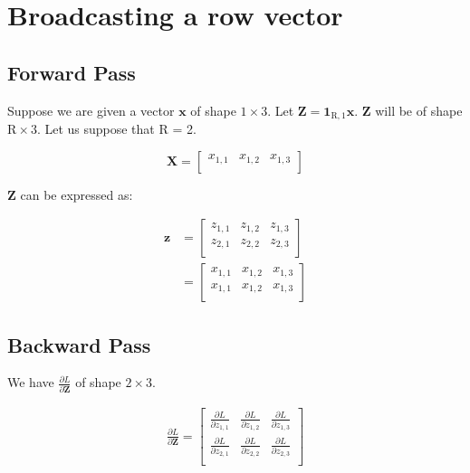 \documentclass{article}
\newcommand{\vecr}[1]{\bm{#1}}
\newcommand{\matr}[1]{\mathbf{#1}} %
\begin{document}
\section{Broadcasting a row vector}
\subsection{Forward Pass}
Suppose we are given a vector $\vecr{x}$ of shape $1 \times 3$. Let $\matr{Z} = \mathbf{1}_{\text{R},1} \vecr{x}$. $\matr{Z}$ will be of shape $\text{R} \times 3$. Let us suppose that R = 2.

\begin{displaymath}
\matr{X} =
\begin{bmatrix}
x_{1,1} & x_{1,2} & x_{1,3} \\%
\end{bmatrix}
\end{displaymath}

$\matr{Z}$ can be expressed as:

\begin{align}
\vecr{z} &=
\begin{bmatrix}
z_{1,1} & z_{1,2} & z_{1,3} \\
z_{2,1} & z_{2,2} & z_{2,3} \\
\end{bmatrix}
\nonumber \\
&=
\begin{bmatrix}
x_{1,1} & x_{1,2} & x_{1,3} \\%
x_{1,1} & x_{1,2} & x_{1,3} \\%
\end{bmatrix}
\end{align}

\subsection{Backward Pass}
We have $\frac{\partial L}{\partial \matr{Z}}$ of shape $2 \times 3$.

\begin{align}
\frac{\partial L}{\partial \matr{Z}} =
\begin{bmatrix}
\frac{\partial L}{\partial z_{1,1}} & \frac{\partial L}{\partial z_{1,2}} & \frac{\partial L}{\partial z_{1,3}}\\[0.7em]
\frac{\partial L}{\partial z_{2,1}} & \frac{\partial L}{\partial z_{2,2}} & \frac{\partial L}{\partial z_{2,3}}\\[0.7em]
\end{bmatrix}
\end{align}
\end{document}
